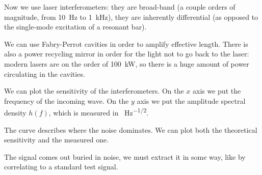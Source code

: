 \documentclass[main.tex]{subfiles}
\begin{document}
Now we use laser interferometers: they are broad-band (a couple orders of magnitude, from \SI{10}{Hz} to \SI{1}{kHz}), they are inherently differential (as opposed to the single-mode excitation of a resonant bar). 

We can use Fabry-Perrot cavities in order to amplify effective length. 
There is also a power recycling mirror in order for the light not to go back to the laser: modern lasers are on the order of \SI{100}{kW}, so there is a huge amount of power circulating in the cavities.

We can plot the sensitivity of the interferometers. 
On the \(x\) axis we put the frequency of the incoming wave. 
On the \(y\) axis we put the amplitude spectral density \(h(f)\), which is measured in \SI{}{Hz^{-1/2}}. 


The curve describes where the noise dominates. 
We can plot both the theoretical sensitivity and the measured one.

The signal comes out buried in noise, we must extract it in some way, like by correlating to a standard test signal.
\end{document}
